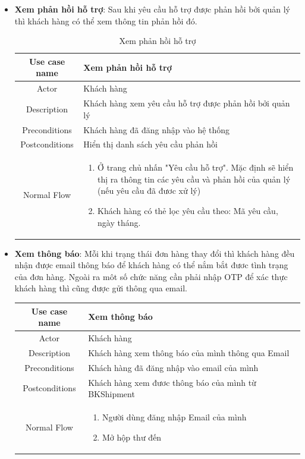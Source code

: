 \begin{itemize}
\begin{itemize}
			\item \textbf{Xem phản hồi hỗ trợ}: Sau khi yêu cầu hỗ trợ được phản hồi bởi quản lý thì khách hàng có thể xem thông tin phản hồi đó.
			
			\begin{table}[H]
				\centering\begin{tabular}{|c|m{25em}|}
					\hline 
					Use case name & Xem phản hồi hỗ trợ\\ 
					\hline 
					Actor & Khách hàng \\ 
					\hline
					Description & Khách hàng xem yêu cầu hỗ trợ được phản hồi bởi quản lý \\
					\hline 
					Preconditions & Khách hàng đã đăng nhập vào hệ thống \\
					\hline
					Postconditions & Hiển thị danh sách yêu cầu phản hồi \\
					\hline
					Normal Flow & \begin{enumerate}
						\item Ở trang chủ nhấn "Yêu cầu hỗ trợ". Mặc định sẽ hiển thị ra thông tin các yêu cầu và phản hồi của quản lý (nếu yêu cầu đã đươc xử lý)
						\item Khách hàng có thẻ lọc yêu cầu theo: Mã yêu cầu, ngày tháng.
				
					\end{enumerate}
					\\
					\hline
				\end{tabular}
				\caption{Xem phản hồi hỗ trợ}
			\end{table}
			
			\item \textbf{Xem thông báo}: Mỗi khi trạng thái đơn hàng thay đổi thì khách hàng đều nhận được email thông báo để khách hàng có thể nắm bắt đươc tình trạng của đơn hàng. Ngoài ra môt số chức năng cần phải nhập OTP để xác thực khách hàng thì cũng được gửi thông qua email.
			
			\begin{table}[H]
				\centering\begin{tabular}{|c|m{25em}|}
					\hline 
					Use case name & Xem thông báo\\ 
					\hline 
					Actor & Khách hàng \\ 
					\hline
					Description & Khách hàng xem thông báo của mình thông qua Email \\
					\hline 
					Preconditions & Khách hàng đã đăng nhập vào email của mình \\
					\hline
					Postconditions & Khách hàng xem đươc thông báo của mình từ BKShipment \\
					\hline
					Normal Flow & \begin{enumerate}
						\item Người dùng đăng nhập Email của mình
						\item Mở hộp thư đến
						

\end{enumerate}
\end{tabular}
\end{table}
\end{itemize}
\end{itemize}

